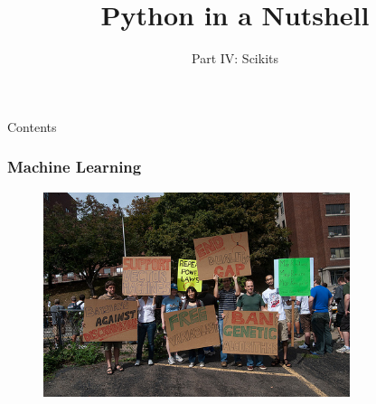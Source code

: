 \documentclass[10pt, colorlinks]{beamer}
\title{ Python in a Nutshell}
\subtitle
 {Part IV: Scikits } %
\begin{document}
\begin{frame}[plain]
   \maketitle
\end{frame}

\begin{frame}[allowframebreaks]{Contents}
  \tableofcontents
\end{frame}

\begin{frame}[fragile]\frametitle{Machine Learning}
\begin{figure}[!htb]
    \centering
    \includegraphics[width=0.8\textwidth]{figs/machine}
\end{figure}
\end{frame}
\end{document}

